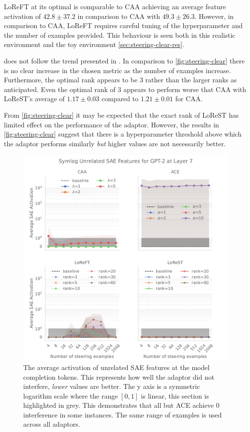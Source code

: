 LoReFT at its optimal is comparable to CAA achieving an average feature activation of $42.8 \pm 37.2$ in comparison to CAA with $49.3 \pm 26.3$.
However, in comparison to CAA, LoReFT requires careful tuning of the hyperparameter and the number of examples provided.
This behaviour is seen both in this realistic environment and the toy environment \cref{sec:steering-clear-res}.

 does not follow the trend presented in \citet{steering-clear}.
In comparison to \cref{fig:steering-clear} there is no clear increase in the chosen metric as the number of examples increase.
Furthermore, the optimal rank appears to be $3$ rather than the larger ranks as anticipated.
Even the optimal rank of $3$ appears to perform worse that CAA with LoReST's average of $1.17 \pm 0.03$ compared to $1.21 \pm 0.01$ for CAA.

From \cref{fig:steering-clear} it may be expected that the exact rank of LoReST has limited effect on the performance of the adaptor.
However, the results in \cref{fig:steering-clear} suggest that there is a hyperparameter threshold above which the adaptor performs similarly \emph{but} higher values are not necessarily better.

\begin{figure}
    \centering
    \captionsetup{width=\textwidth}
    \includegraphics[width=\textwidth]{figures/gpt2_7_unrelated.pdf}
    \caption{
        The average activation of unrelated SAE features at the model completion tokens.
        This represents how well the adaptor did not interfere, \emph{lower} values are better.
        The y axis is a symmetric logarithm scale where the range $[0,1]$ is linear, this section is highlighted in grey.
        This demonstrates that all but ACE achieve 0 interference in some instances.
        The same range of examples is used across all adaptors.
    }
    \label{fig:gpt-pp-unrelated}
\end{figure}

